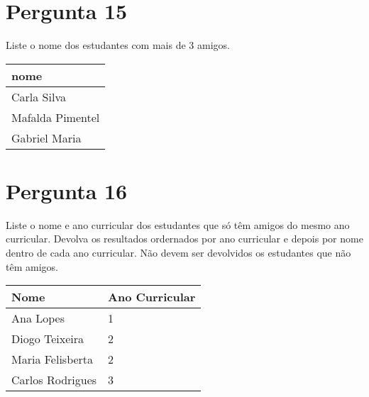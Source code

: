 \section{Pergunta 15}
Liste o nome dos estudantes com mais de 3 amigos.
\begin{center} \begin{tabular}{l}
    \textbf{nome}    \\ \hline
    Carla Silva      \\
    Mafalda Pimentel \\
    Gabriel Maria
\end{tabular} \end{center}


\section{Pergunta 16}
Liste o nome e ano curricular dos estudantes que só têm amigos do mesmo ano curricular. Devolva os resultados ordernados por ano curricular e depois por nome dentro de cada ano curricular. Não devem ser devolvidos os estudantes que não têm amigos.
\begin{center} \begin{tabular}{l | l}
    \textbf{Nome}    & \textbf{Ano Curricular} \\ \hline
    Ana Lopes        & 1                       \\
    Diogo Teixeira   & 2                       \\
    Maria Felisberta & 2                       \\
    Carlos Rodrigues & 3
\end{tabular} \end{center}


